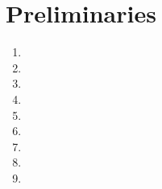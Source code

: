 \section{Preliminaries}

\begin{enumerate}

\item
        
\item
        
\item
        
\item
        
\item
        
\item
        
\item
        
\item
        
\item
        

\end{enumerate}
